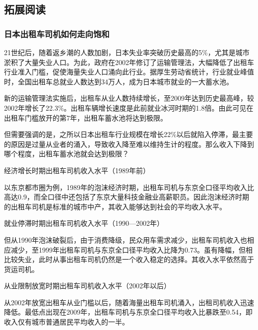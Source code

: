 \subsection{拓展阅读}

\subsubsection{日本出租车司机如何走向饱和}

{\fangsong 21世纪后，随着返乡潮的人数加剧，日本失业率突破历史最高的5\%，尤其是城市淤积了大量失业人口。为此，政府在2002年修订了运输管理法，大幅降低了出租车行业准入门槛，促使海量失业人口涌向此行业。据厚生劳动省统计，行业就业峰值时，全国出租车总就业人数达到34万人，成为日本城市就业的一大蓄水池。\par}

{\fangsong 新的运输管理法实施后，出租车从业人数持续增长，至2009年达到历史最高峰，较2002年增长了22.3\%。出租车辆增长速度是此前就业冰河时期的1.8倍。由此可见在出租车门槛放开的第7年，出租车蓄水池将达到极限。\par}

{\fangsong 但需要强调的是，之所以日本出租车行业规模在增长22\%以后就陷入停滞，最主要的原因是过量从业者的涌入，导致收入降至难以维持生计的程度。那么收入下降到哪个程度，出租车蓄水池就会达到极限？\par}

经济增长时期出租车司机收入水平（1989年前）

{\fangsong 以东京都市圈为例，1989年的泡沫经济时期，出租车司机与东京全口径平均收入比高达0.9，而全口径中还包括了东京大量科技金融业高薪职员。因此泡沫经济时期的出租车司机是标准的城市中产，其收入能够达到社会的平均收入水平。\par}

就业停滞时期出租车司机收入水平（1990—2002年）

{\fangsong 但从1990年泡沫破裂后，由于消费降级，民众用车需求减少，出租车司机收入也相应减少，至1999年出租车司机与东京全口径平均收入比降为0.73。虽有降幅，但相比较失业，此时从事出租车司机仍然是一个收入稳定的选择。其收入水平依然高于货运司机。\par}

从业限制放宽时期出租车司机收入水平（2002年以后）

{\fangsong 从2002年放宽出租车从业门槛以后，随着海量出租车司机涌入，出租司机收入迅速降低。最低点出现在2009年，出租车司机与东京全口径平均收入比暴跌至0.54，即收入仅有城市普通居民平均收入的一半。\par}
